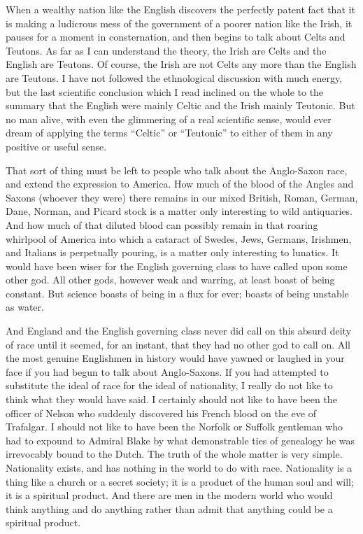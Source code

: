 When a wealthy nation like the English discovers the perfectly patent fact that it is making a ludicrous mess of the government of a poorer nation like the Irish, it pauses for a moment in consternation, and then begins to talk about Celts and Teutons. As far as I can understand the theory, the Irish are Celts and the English are Teutons. Of course, the Irish are not Celts any more than the English are Teutons. I have not followed the ethnological discussion with much energy, but the last scientific conclusion which I read inclined on the whole to the summary that the English were mainly Celtic and the Irish mainly Teutonic. But no man alive, with even the glimmering of a real scientific sense, would ever dream of applying the terms “Celtic” or “Teutonic” to either of them in any positive or useful sense.

That sort of thing must be left to people who talk about the Anglo-Saxon race, and extend the expression to America. How much of the blood of the Angles and Saxons (whoever they were) there remains in our mixed British, Roman, German, Dane, Norman, and Picard stock is a matter only interesting to wild antiquaries. And how much of that diluted blood can possibly remain in that roaring whirlpool of America into which a cataract of Swedes, Jews, Germans, Irishmen, and Italians is perpetually pouring, is a matter only interesting to lunatics. It would have been wiser for the English governing class to have called upon some other god. All other gods, however weak and warring, at least boast of being constant. But science boasts of being in a flux for ever; boasts of being unstable as water.

And England and the English governing class never did call on this absurd deity of race until it seemed, for an instant, that they had no other god to call on. All the most genuine Englishmen in history would have yawned or laughed in your face if you had begun to talk about Anglo-Saxons. If you had attempted to substitute the ideal of race for the ideal of nationality, I really do not like to think what they would have said. I certainly should not like to have been the officer of Nelson who suddenly discovered his French blood on the eve of Trafalgar. I should not like to have been the Norfolk or Suffolk gentleman who had to expound to Admiral Blake by what demonstrable ties of genealogy he was irrevocably bound to the Dutch. The truth of the whole matter is very simple. Nationality exists, and has nothing in the world to do with race. Nationality is a thing like a church or a secret society; it is a product of the human soul and will; it is a spiritual product. And there are men in the modern world who would think anything and do anything rather than admit that anything could be a spiritual product.

